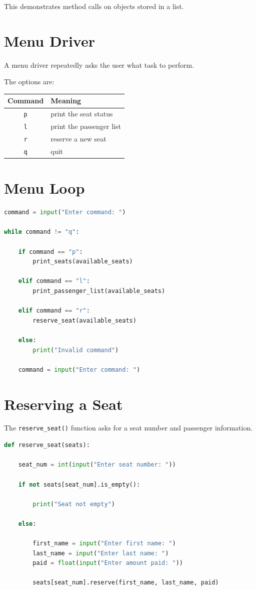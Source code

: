 \documentclass[11pt]{article}
\begin{document}
This demonstrates method calls on objects stored in a list.

\section{Menu Driver}

A menu driver repeatedly asks the user what task to perform.

The options are:

\begin{center}
\begin{tabular}{cl}
\toprule
Command & Meaning \\
\midrule
\texttt{p} & print the seat status \\
\texttt{l} & print the passenger list \\
\texttt{r} & reserve a new seat \\
\texttt{q} & quit \\
\bottomrule
\end{tabular}
\end{center}

\section{Menu Loop}

\begin{lstlisting}[language=Python]
command = input("Enter command: ")

while command != "q":

    if command == "p":
        print_seats(available_seats)

    elif command == "l":
        print_passenger_list(available_seats)

    elif command == "r":
        reserve_seat(available_seats)

    else:
        print("Invalid command")

    command = input("Enter command: ")
\end{lstlisting}

\section{Reserving a Seat}

The \texttt{reserve\_seat()} function asks for a seat number and passenger information.

\begin{lstlisting}[language=Python]
def reserve_seat(seats):

    seat_num = int(input("Enter seat number: "))

    if not seats[seat_num].is_empty():

        print("Seat not empty")

    else:

        first_name = input("Enter first name: ")
        last_name = input("Enter last name: ")
        paid = float(input("Enter amount paid: "))

        seats[seat_num].reserve(first_name, last_name, paid)
\end{lstlisting}
\end{document}
